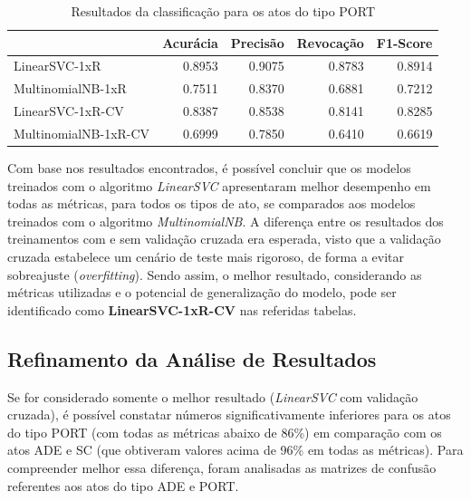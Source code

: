\begin{table}[h]
\caption{Resultados da classificação para os atos do tipo PORT}
\label{tab:resultados-port}
	\begin{center}
	\begin{tabular}{lrrrr}
		\toprule
		{} &  Acurácia &  Precisão &  Revocação &      F1-Score \\
		\midrule
		LinearSVC-1xR        &    0.8953 &    0.9075 &     0.8783 &  0.8914 \\
		MultinomialNB-1xR    &    0.7511 &    0.8370 &     0.6881 &  0.7212 \\
		LinearSVC-1xR-CV     &    0.8387 &    0.8538 &     0.8141 &  0.8285 \\
		MultinomialNB-1xR-CV &    0.6999 &    0.7850 &     0.6410 &  0.6619 \\
		\bottomrule
	\end{tabular}
	\end{center}		
\end{table}

Com base nos resultados encontrados, é possível concluir que os modelos treinados com o algoritmo \textit{LinearSVC} apresentaram melhor desempenho em todas as métricas, para todos os tipos de ato, se comparados aos modelos treinados com o algoritmo \textit{MultinomialNB}. A diferença entre os resultados dos treinamentos com e sem validação cruzada era esperada, visto que a validação cruzada estabelece um cenário de teste mais rigoroso, de forma a evitar sobreajuste (\textit{overfitting}). Sendo assim, o melhor resultado, considerando as métricas utilizadas e o potencial de generalização do modelo, pode ser identificado como \textbf{LinearSVC-1xR-CV} nas referidas tabelas. 

\subsection{Refinamento da Análise de Resultados}

Se for considerado somente o melhor resultado (\textit{LinearSVC} com validação cruzada), é possível constatar números significativamente inferiores para os atos do tipo PORT (com todas as métricas abaixo de 86\%) em comparação com os atos ADE e SC (que obtiveram valores acima de 96\% em todas as métricas). Para compreender melhor essa diferença, foram analisadas as matrizes de confusão referentes aos atos do tipo ADE e PORT.

